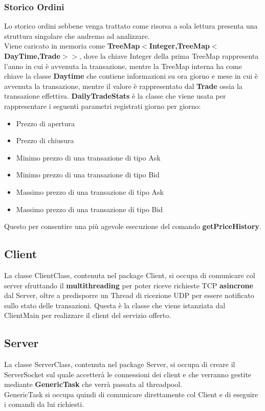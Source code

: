 \documentclass{article}
\begin{document}
\subsubsection{Storico Ordini}
Lo storico ordini sebbene venga trattato come risorsa a sola lettura presenta una struttura singolare che andremo ad analizzare.
\\Viene caricato in memoria come \textbf{TreeMap$<$Integer,TreeMap$<$DayTime,Trade$>$$>$}, dove la chiave Integer della prima TreeMap rappresenta l'anno in cui è avvenuta la transazione, mentre la TreeMap interna ha come chiave la classe \textbf{Daytime} che contiene informazioni su ora giorno e mese in cui è avvenuta la transazione, mentre il valore è rappresentato dal \textbf{Trade} ossia la transazione effettiva.
\textbf{DailyTradeStats} è la classe che viene usata per rappresentare i seguenti parametri registrati giorno per giorno:
\begin{itemize}
  \item Prezzo di apertura
  \item Prezzo di chiusura
  \item Minimo prezzo di una transazione di tipo Ask
  \item Minimo prezzo di una transazione di tipo Bid
  \item Massimo prezzo di una transazione di tipo Ask
  \item Massimo prezzo di una transazione di tipo Bid
\end{itemize}
Questo per consentire una più agevole esecuzione del comando \textbf{getPriceHistory}.

\subsection{Client}
La classe ClientClass, contenuta nel package Client, si occupa di comunicare col server sfruttando il \textbf{multithreading} per poter riceve richieste TCP \textbf{asincrone} dal Server, oltre a predisporre un Thread di ricezione UDP per essere notificato sullo stato delle transazioni. 
Questa è la classe che viene istanziata dal ClientMain per realizzare il client del servizio offerto.

\subsection{Server}
La classe ServerClass, contenuta nel package Server, si occupa di creare il ServerSocket sul quale accetterà le connessioni dei client e che verranno gestite mediante \textbf{GenericTask} che verrà passata al threadpool.\\
GenericTask si occupa quindi di comunicare direttamente col Client e di eseguire i comandi da lui richiesti.
\end{document}
